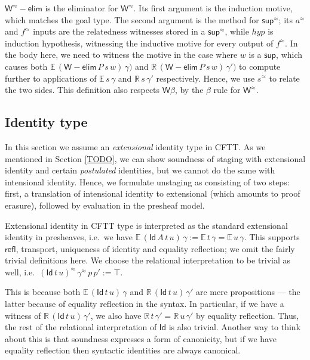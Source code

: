 \documentclass[acmsmall,screen,review,anonymous]{acmart}
\newcommand{\msf}[1]{{\mathsf{#1}}}
\newcommand{\mbb}[1]{\mathbb{#1}}
\newcommand{\rel}{^{\approx}}
\newcommand{\Id}{\msf{Id}}
\newcommand{\ev}{\mbb{E}}
\newcommand{\re}{\mbb{R}}
\newcommand{\welim}{\vW{-}\msf{elim}}
\newcommand{\vW}{\mathsf{W}}
\newcommand{\vsup}{\mathsf{sup}}
\theoremstyle{remark}
\begin{document}
$\vW\rel{-}\msf{elim}$ is the eliminator for $\vW\rel$. Its first argument is
the induction motive, which matches the goal type. The second argument is the
method for $\vsup\rel$; its $a\rel$ and $f\rel$ inputs are the relatedness
witnesses stored in a $\vsup\rel$, while $\mathit{hyp}$ is induction hypothesis,
witnessing the inductive motive for every output of $f\rel$. In the body here,
we need to witness the motive in the case where $w$ is a $\vsup$, which causes
both $\ev\,(\welim\,P\,s\,w)\,\gamma)$ and $\re\,(\welim\,P\,s\,w)\,\gamma')$ to
compute further to applications of $\ev\,s\,\gamma$ and $\re\,s\,\gamma'$
respectively. Hence, we use $s\rel$ to relate the two sides. This definition
also respects $\vW\beta$, by the $\beta$ rule for $\vW\rel$.

\subsection{Identity type}

In this section we assume an \emph{extensional} identity type in CFTT.  As we
mentioned in Section \ref{TODO}, we can show soundness of staging with
extensional identity and certain \emph{postulated} identities, but we cannot do
the same with intensional identity. Hence, we formulate unstaging as consisting
of two steps: first, a translation of intensional identity to extensional (which
amounts to proof erasure), followed by evaluation in the presheaf model.

Extensional identity in CFTT type is interpreted as the standard extensional
identity in presheaves, i.e.\ we have $\ev\,(\msf{Id}\,A\,t\,u)\,\gamma :=
\ev\,t\,\gamma = \ev\,u\,\gamma$. This supports $\msf{refl}$, transport,
uniqueness of identity and equality reflection; we omit the fairly trivial
definitions here. We choose the relational interpretation to be trivial as well,
i.e.\ $(\msf{Id}\,t\,u)\rel\,\gamma\rel\,p\,p' := \top$.

This is because both $\ev\,(\Id\,t\,u)\,\gamma$ and $\re\,(\Id\,t\,u)\,\gamma'$
are mere propositions --- the latter because of equality reflection in the
syntax.  In particular, if we have a witness of $\re\,(\Id\,t\,u)\,\gamma'$, we
also have $\re\,t\,\gamma' = \re\,u\,\gamma'$ by equality reflection. Thus, the
rest of the relational interpretation of $\Id$ is also trivial. Another way to
think about this is that soundness expresses a form of canonicity, but if we
have equality reflection then syntactic identities are always canonical.
\end{document}

